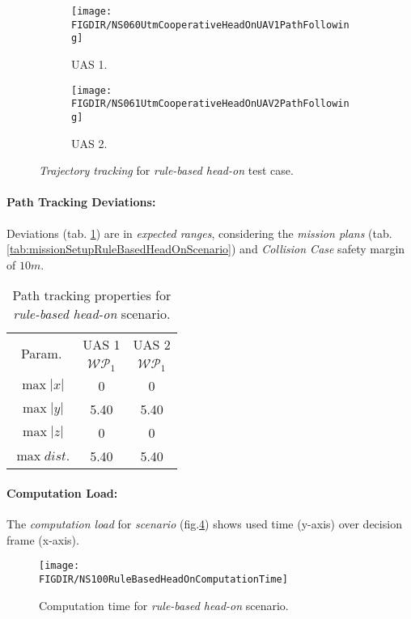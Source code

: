 \begin{figure}[H]
	\centering
    \begin{subfigure}{0.48\textwidth}
    	\centering
        \texttt{[image: \\FIGDIR/NS060UtmCooperativeHeadOnUAV1PathFollowing]}
        \caption{UAS 1.}
        \label{fig:ruleBasedHeadOnUAS1PathTracking}
    \end{subfigure}
    \begin{subfigure}{0.48\textwidth}
    	\centering
        \texttt{[image: \\FIGDIR/NS061UtmCooperativeHeadOnUAV2PathFollowing]} 
        \caption{UAS 2.}
        \label{fig:ruleBasedHeadOnUAS2PathTracking}
    \end{subfigure}
    \caption{\emph{Trajectory tracking} for \emph{rule-based head-on} test case. }
    \label{fig:ruleBasedHeadOnTrajectoryTrackingPerformance}
\end{figure}

\paragraph{Path Tracking Deviations:} Deviations (tab. \ref{tab:pathTrackingParametersForRuleBasedHeadOn}) are in \emph{expected ranges}, considering the \emph{mission plans} (tab. \ref{tab:missionSetupRuleBasedHeadOnScenario}) and \emph{Collision Case} safety margin of $10 m$.

\begin{table}[H]
    \centering
    \begin{tabular}{c||c|c}
        \multirow{2}{*}{Param.} & UAS 1     & UAS 2              \\\cline{2-3}
                        & $\mathscr{WP}_1$  & $\mathscr{WP}_1$   \\\hline\hline
          $\max |x|$    & 0                 & 0                  \\\hline
          $\max |y|$    & 5.40              & 5.40              \\\hline
          $\max |z|$    & 0                 & 0                  \\\hline
          $\max dist.$  & 5.40              & 5.40              \\
    \end{tabular}
    \caption{Path tracking properties for \emph{rule-based head-on} scenario.}
    \label{tab:pathTrackingParametersForRuleBasedHeadOn}
\end{table}

\paragraph{Computation Load:} The \emph{computation load} for \emph{scenario} (fig.\ref{fig:ruleBasedHeadOnComputationTime}) shows used time (y-axis) over decision frame (x-axis).

\begin{figure}[H]
    \centering
    \texttt{[image: \\FIGDIR/NS100RuleBasedHeadOnComputationTime]} 
    \caption{Computation time for \emph{rule-based head-on} scenario.}
    \label{fig:ruleBasedHeadOnComputationTime}
\end{figure}